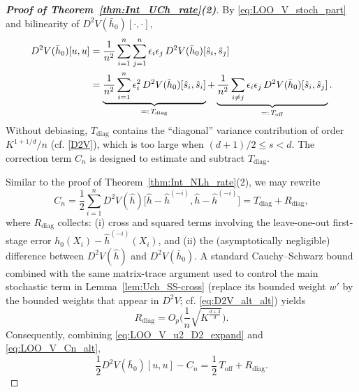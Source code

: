 \documentclass[12pt,american]{article}
\theoremstyle{definition}
\theoremstyle{plain}
\theoremstyle{definition}
\theoremstyle{plain}
\theoremstyle{plain}
\theoremstyle{plain}
\theoremstyle{plain}
\theoremstyle{plain}
\begin{document}
\begin{proof}[\textbf{Proof of Theorem~\ref{thm:Int_UCh_rate}(2)}]
\smallskip
By \eqref{eq:LOO_V_stoch_part} and bilinearity of $D^2V(\bar h_0)[\cdot,\cdot]$,
\begin{align}\label{eq:LOO_V_u2_D2_expand}
D^2V(\bar h_0)[u,u]
&=\frac{1}{n^2}\sum_{i=1}^n\sum_{j=1}^n \epsilon_i\epsilon_j\,D^2V(\bar h_0)[\hat s_i,\hat s_j]\\\nonumber
&=\underbrace{\frac{1}{n^2}\sum_{i=1}^n \epsilon_i^2\,D^2V(\bar h_0)[\hat s_i,\hat s_i]}_{=:\,T_{\mathrm{diag}}}
+\underbrace{\frac{1}{n^2}\sum_{i\ne j} \epsilon_i\epsilon_j\,D^2V(\bar h_0)[\hat s_i,\hat s_j]}_{=:\,T_{\mathrm{off}}}.
\end{align}
Without debiasing, $T_{\mathrm{diag}}$ contains the ``diagonal'' variance contribution of order $K^{1+1/d}/n$ (cf. \eqref{D2V}), which is too large when $(d+1)/2\le s<d$.
The correction term $C_n$ is designed to estimate and subtract $T_{\mathrm{diag}}$.

Similar to the proof of Theorem~\ref{thm:Int_NLh_rate}(2), we may rewrite
\begin{equation}\label{eq:LOO_V_Cn_alt}
C_n
=\frac12\sum_{i=1}^n D^2V(\hat h)\big[\hat h-\hat h^{(-i)},\hat h-\hat h^{(-i)}\big]=T_{\mathrm{diag}}+R_{\mathrm{diag}},
\end{equation}
where $R_{\mathrm{diag}}$ collects:
(i) cross and squared terms involving the leave-one-out first-stage error $h_0(X_i)-\hat h^{(-i)}(X_i)$, and
(ii) the (asymptotically negligible) difference between $D^2V(\hat h)$ and $D^2V(\bar h_0)$.
A standard Cauchy--Schwarz bound combined with the same matrix-trace argument used to control the main stochastic term in Lemma~\ref{lem:Uch_SS-cross} (replace its bounded weight $w'$ by the bounded weights that appear in $D^2V$; cf. \eqref{eq:D2V_alt_alt}) yields
\begin{equation}\label{eq:LOO_V_Rdiag_rate}
R_{\mathrm{diag}}=O_p\Big(\frac1n\sqrt{K^{\frac{d+3}{d}}}\Big).
\end{equation}
Consequently, combining \eqref{eq:LOO_V_u2_D2_expand} and \eqref{eq:LOO_V_Cn_alt},
\begin{equation}\label{eq:LOO_V_Tquad_minus_Cn}
\frac12 D^2V(\bar h_0)[u,u]-C_n
=\frac12\,T_{\mathrm{off}}+R_{\mathrm{diag}}.
\end{equation}


\end{proof}
\end{document}

